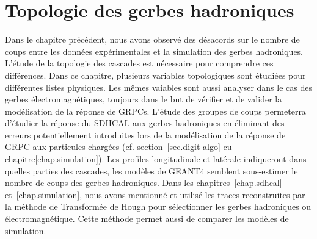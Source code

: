 \chapter{Topologie des gerbes hadroniques}
\label{chap.topo}
Dans le chapitre précédent, nous avons observé des désacords sur le nombre de coups entre les données expérimentales et la simulation des gerbes hadroniques. L'étude de la topologie des cascades est nécessaire pour comprendre ces différences. Dans ce chapitre, plusieurs variables topologiques sont étudiées pour différentes listes physiques. Les mêmes vaiables sont aussi analyser dans le cas des gerbes électromagnétiques, toujours dans le but de vérifier et de valider la modélisation de la réponse de GRPCs. L'étude des groupes de coups permeterra d'étudier la réponse du SDHCAL aux gerbes hadroniques en éliminant des erreurs potentiellement introduites lors de la modélisation de la réponse de GRPC aux particules chargées (cf. section~\ref{sec.digit-algo} cu chapitre\ref{chap.simulation}). Les profiles longitudinale et latérale indiqueront dans quelles parties des cascades, les modèles de GEANT4 semblent sous-estimer le nombre de coups des gerbes hadroniques. Dans les chapitres~\ref{chap.sdhcal} et~\ref{chap.simulation}, nous avons mentionné et utilisé les traces reconstruites par la méthode de Transformée de Hough pour sélectionner les gerbes hadroniques ou électromagnétique. Cette méthode permet aussi de comparer les modèles de simulation.
\minitoc
\newpage



